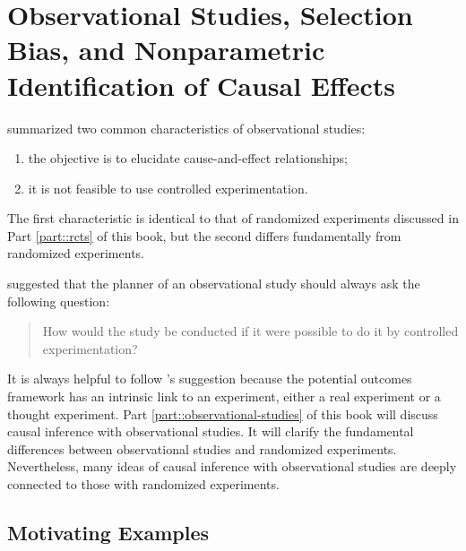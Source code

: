 \chapter{Observational Studies, Selection Bias, and Nonparametric Identification of Causal Effects}\label{chapter::observational-studies}

 
\citet{cochran1965planning} summarized  two common characteristics of observational studies:
\begin{enumerate}
\item
the objective is to elucidate cause-and-effect relationships;
\item 
it is not feasible to use controlled experimentation. 
\end{enumerate}

The first characteristic is identical to that of randomized experiments discussed in Part \ref{part::rcts} of this book, but the second differs fundamentally from randomized experiments. 


\citet{dorn1953philosophy} suggested that the planner of an observational study should always ask the following question:
\begin{quote}
How would the study be conducted if it were possible to do
it by controlled experimentation?
\end{quote}
It is always helpful to follow \citet{dorn1953philosophy}'s suggestion because the potential outcomes framework has an intrinsic link to an experiment, either a real experiment or a thought experiment. Part \ref{part::observational-studies} of this book will discuss causal inference with observational studies. It will clarify the fundamental differences between observational studies and randomized experiments. Nevertheless, many ideas of causal inference with observational studies are deeply connected to those with randomized experiments. 

 


\section{Motivating Examples}
 
